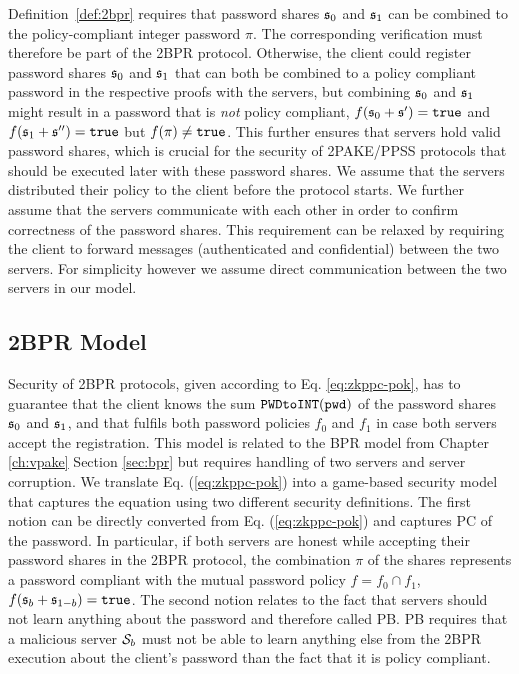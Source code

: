 \noindent
Definition~\ref{def:2bpr} requires that password shares $\mathfrak{s}_0$ and $\mathfrak{s}_1$ can be combined to the policy-compliant integer password $\pi$. The corresponding verification must therefore be part of the \ac{2BPR} protocol. 
Otherwise, the client could register password shares $\mathfrak{s}_0$ and $\mathfrak{s}_1$ that can both be combined to a policy compliant password in the respective proofs with the servers, but combining $\mathfrak{s}_0$ and $\mathfrak{s}_1$ might result in a password that is \emph{not} policy compliant, \ie $f(\mathfrak{s}_0+\mathfrak{s}')=\mathtt{true}$ and $f(\mathfrak{s}_1+\mathfrak{s}'')=\mathtt{true}$ but $f(\pi)\not=\mathtt{true}$.
This further ensures that servers hold valid password shares, which is crucial for the security of \ac{2PAKE}/\ac{PPSS} protocols that should be executed later with these password shares.
We assume that the servers distributed their policy to the client before the protocol starts.
We further assume that the servers communicate with each other in order to confirm correctness of the password shares.
This requirement can be relaxed by requiring the client to forward messages (authenticated and confidential) between the two servers.
For simplicity however we assume direct communication between the two servers in our model.


\subsection{2BPR Model}\label{sec:securitymodel}
Security of \ac{2BPR} protocols, given according to Eq. \ref{eq:zkppc-pok}, has to guarantee that the client knows the sum $\texttt{PWDtoINT}(\mathtt{pwd})$ of the password shares $\mathfrak{s}_0$ and $\mathfrak{s}_1$, and that \pwd fulfils both password policies $f_0$ and $f_1$ in case both servers accept the registration.
This model is related to the \ac{BPR} model from Chapter \ref{ch:vpake} Section \ref{sec:bpr} but requires handling of two servers and server corruption.
We translate Eq. (\ref{eq:zkppc-pok}) into a game-based security model that captures the equation using two different security definitions.
The first notion can be directly converted from Eq. (\ref{eq:zkppc-pok}) and captures \acl{PC} of the password.
In particular, if both servers are honest while accepting their password shares in the \ac{2BPR} protocol, the combination $\pi$ of the shares represents a password compliant with the mutual password policy $f=f_0\cap f_1$, \ie $f(\mathfrak{s}_b+\mathfrak{s}_{1-b})=\mathtt{true}$.
The second notion relates to the fact that servers should not learn anything about the password and therefore called \ac{PB}.
\ac{PB} requires that a malicious server $\mathcal{S}_b$ must not be able to learn anything else from the \ac{2BPR} execution about the client's password than the fact that it is policy compliant.

